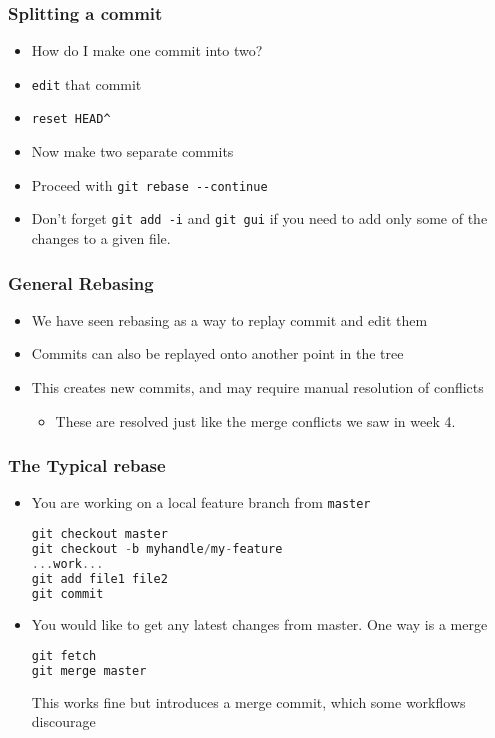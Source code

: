 \documentclass{beamer}
\begin{document}
\begin{frame}[fragile]
\frametitle{Splitting a commit}
\begin{itemize}
\item How do I make one commit into two?
\item \texttt{edit} that commit
\item \lstinline{reset HEAD^}
\item Now make two separate commits
\item Proceed with \lstinline{git rebase --continue}
\item Don't forget \lstinline{git add -i} and \lstinline{git gui} if you need to add only some of the changes to a given file.
\end{itemize}
\end{frame}

\begin{frame}[fragile]
\frametitle{General Rebasing}
\begin{itemize}
\item We have seen rebasing as a way to replay commit and edit them
\item Commits can also be replayed onto another point in the tree
\item This creates new commits, and may require manual resolution of conflicts
\begin{itemize}
\item These are resolved just like the merge conflicts we saw in week 4.
\end{itemize}
\end{itemize}
\end{frame}

\begin{frame}[fragile]
\frametitle{The Typical rebase}
\begin{itemize}
\item You are working on a local feature branch from \texttt{master}
\begin{lstlisting}[language=C++]
git checkout master
git checkout -b myhandle/my-feature
...work...
git add file1 file2
git commit
\end{lstlisting}
\item You would like to get any latest changes from master. One way is a merge
\begin{lstlisting}[language=C++]
git fetch
git merge master
\end{lstlisting}
This works fine but introduces a merge commit, which some workflows discourage
\end{itemize}
\end{frame}
\end{document}
